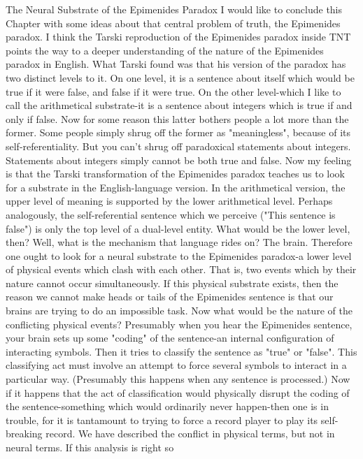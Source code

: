 {               The Neural Substrate of the Epimenides Paradox
I would like to conclude this Chapter with some ideas about that central problem of truth,
the Epimenides paradox. I think the Tarski reproduction of the Epimenides paradox
inside TNT points the way to a deeper understanding of the nature of the Epimenides
paradox in English. What Tarski found was that his version of the paradox has two
distinct levels to it. On one level, it is a sentence about itself which would be true if it
were false, and false if it were true. On the other level-which I like to call the arithmetical
substrate-it is a sentence about integers which is true if and only if false.
        Now for some reason this latter bothers people a lot more than the former. Some
people simply shrug off the former as "meaningless", because of its self-referentiality.
But you can't shrug off paradoxical statements about integers. Statements about integers
simply cannot be both true and false.
        Now my feeling is that the Tarski transformation of the Epimenides paradox
teaches us to look for a substrate in the English-language version. In the arithmetical
version, the upper level of meaning is supported by the lower arithmetical level. Perhaps
analogously, the self-referential sentence which we perceive ("This sentence is false") is
only the top level of a dual-level entity. What would be the lower level, then? Well, what
is the mechanism that language rides on? The brain. Therefore one ought to look for a
neural substrate to the Epimenides paradox-a lower level of physical events which clash
with each other. That is, two events which by their nature cannot occur simultaneously. If
this physical substrate exists, then the reason we cannot make heads or tails of the
Epimenides sentence is that our brains are trying to do an impossible task.
        Now what would be the nature of the conflicting physical events? Presumably
when you hear the Epimenides sentence, your brain sets up some "coding" of the
sentence-an internal configuration of interacting symbols. Then it tries to classify the
sentence as "true" or "false". This classifying act must involve an attempt to force several
symbols to interact in a particular way. (Presumably this happens when any sentence is
processed.) Now if it happens that the act of classification would physically disrupt the
coding of the sentence-something which would ordinarily never happen-then one is in
trouble, for it is tantamount to trying to force a record player to play its self-breaking
record. We have described the conflict in physical terms, but not in neural terms. If this
analysis is right so




}
